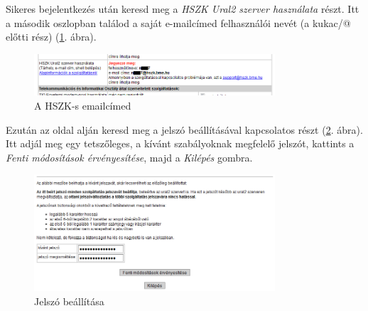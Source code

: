 \documentclass[a4paper,10pt,titlepage]{article}
\begin{document}
Sikeres bejelentkezés után keresd meg a \textit{HSZK Ural2 szerver használata} részt. Itt a második oszlopban találod a saját e-mailcímed felhasználói nevét (a kukac/@ előtti rész) (\ref{fig:hszk_acc_admin_mailcim}. ábra).

\begin{figure}[h!]
\centering
\includegraphics[width=0.80\textwidth]{figures/hszk_acc_admin_mailcim.png}
\caption{A HSZK-s emailcímed \label{fig:hszk_acc_admin_mailcim}}
\end{figure}

Ezután az oldal alján keresd meg a jelszó beállításával kapcsolatos részt (\ref{fig:hszk_acc_admin_jelszo}. ábra). Itt adjál meg egy tetszőleges, a kívánt szabályoknak megfelelő jelszót, kattints a \textit{Fenti módosítások érvényesítése}, majd a \textit{Kilépés} gombra.

\begin{figure}[h!]
\centering
\includegraphics[width=0.80\textwidth]{figures/hszk_acc_admin_jelszo.png}
\caption{Jelszó beállítása \label{fig:hszk_acc_admin_jelszo}}
\end{figure}
\end{document}
